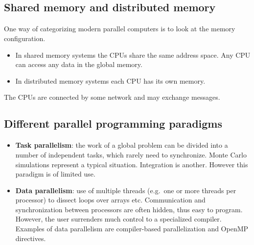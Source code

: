 \documentclass[%
oneside,                 %
final,                   %
10pt]{article}
\begin{document}
\noindent


\subsection*{Shared memory and distributed memory}

\paragraph{}
One way of categorizing modern parallel computers is to look at the memory configuration.
\begin{itemize}
\item In shared memory systems the CPUs share the same address space. Any CPU can access any data in the global memory.

\item In distributed memory systems each CPU has its own memory.
\end{itemize}

\noindent
The CPUs are connected by some network and may exchange messages.



\subsection*{Different parallel programming paradigms}

\paragraph{}

\begin{itemize}
\item \textbf{Task parallelism}:  the work of a global problem can be divided into a number of independent tasks, which rarely need to synchronize.  Monte Carlo simulations represent a typical situation. Integration is another. However this paradigm is of limited use.

\item \textbf{Data parallelism}:  use of multiple threads (e.g.~one or more threads per processor) to dissect loops over arrays etc.  Communication and synchronization between processors are often hidden, thus easy to program. However, the user surrenders much control to a specialized compiler. Examples of data parallelism are compiler-based parallelization and OpenMP directives. 
\end{itemize}
\end{document}
